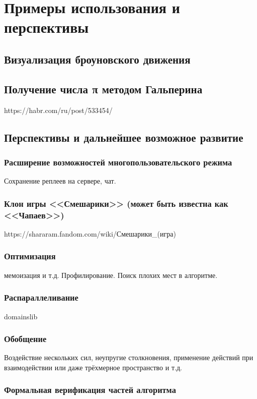 \chapter{Примеры использования и перспективы}

\TODO

\section{Визуализация броуновского движения}

\TODO

\section{Получение числа π методом Гальперина}\label{pipool}

\TODO https://habr.com/ru/post/533454/

\section{Перспективы и дальнейшее возможное развитие}

\subsection{Расширение возможностей многопользовательского режима}

\TODO Сохранение реплеев на сервере, чат.

\subsection{Клон игры <<Смешарики>> (может быть известна как <<Чапаев>>)}

\TODO https://shararam.fandom.com/wiki/Смешарики\_(игра)

\subsection{Оптимизация}

\TODO мемоизация и т.д.
Профилирование. Поиск плохих мест в алгоритме.

\subsection{Распараллеливание}

\TODO domainslib

\subsection{Обобщение \TODO}

\TODO Воздействие нескольких сил, неупругие столкновения,
применение действий при взаимодействии или даже трёхмерное пространство и т.д.

\subsection{Формальная верификация частей алгоритма}

\TODO
